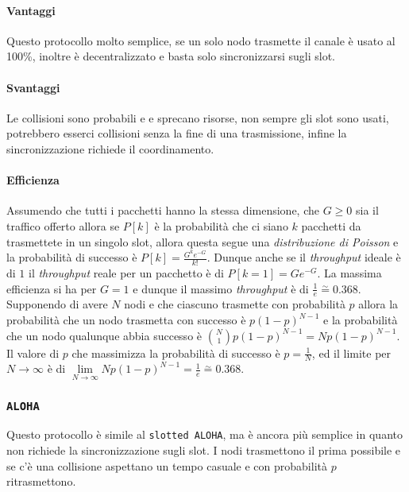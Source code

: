             \paragraph{Vantaggi} Questo protocollo molto semplice, se un solo nodo trasmette il canale è usato al 100\%, inoltre è decentralizzato e basta solo sincronizzarsi sugli slot.
            \paragraph{Svantaggi} Le collisioni sono probabili e e sprecano risorse, non sempre gli slot sono usati, potrebbero esserci collisioni senza la fine di una trasmissione, infine la sincronizzazione richiede il coordinamento.
            \paragraph{Efficienza} Assumendo che tutti i pacchetti hanno la stessa dimensione, che $G\geq 0$ sia il traffico offerto allora se $P[k]$ è la probabilità che ci siano $k$ pacchetti da trasmettete in un singolo slot, allora questa segue una \textit{distribuzione di Poisson} e la probabilità di successo è $P[k]=\frac{G^ke^{-G}}{k!}$. Dunque anche se il \textit{throughput} ideale è di $1$ il \textit{throughput} reale per un pacchetto è di $P[k=1]=Ge^{-G}$. La massima efficienza si ha per $G=1$ e dunque il massimo \textit{throughput} è di $\frac{1}{e}\stackrel{\sim}{=} 0.368$. \newline
            Supponendo di avere $N$ nodi e che ciascuno trasmette con probabilità $p$ allora la probabilità che un nodo trasmetta con successo è $p(1-p)^{N-1}$ e la probabilità che un nodo qualunque abbia successo è $\binom{N}{1}p(1-p)^{N-1} = Np(1-p)^{N-1}$. Il valore di $p$ che massimizza la probabilità di successo è $p=\frac{1}{N}$, ed il limite per $N\to\infty$ è di $\lim\limits_{N\to\infty}Np(1-p)^{N-1}=\frac{1}{e}\stackrel{\sim}{=}0.368$.
        \subsubsection{\texttt{ALOHA}}
            Questo protocollo è simile al \texttt{slotted ALOHA}, ma è ancora più semplice in quanto non richiede la sincronizzazione sugli slot. I nodi trasmettono il prima possibile e se c'è una collisione aspettano un tempo casuale e con probabilità $p$ ritrasmettono.
